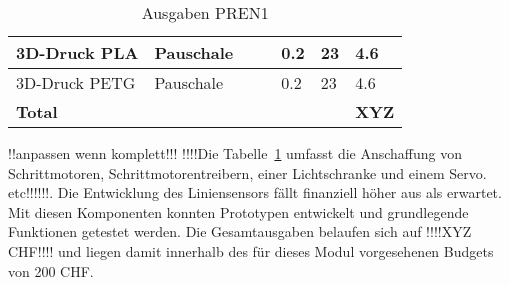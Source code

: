 \documentclass[main.tex]{subfiles} %
\begin{document}
\begin{table}[h]
{\begin{tabular}{|p{3cm}|p{2.5cm}|p{2.5cm}|p{3cm}|p{1cm}|p{1.5cm}|p{1cm}|}
        3D-Druck PLA                           & Pauschale              &                               &                                 & 0.2                 & 23                         & 4.6                              \\ \hline
        3D-Druck PETG                          & Pauschale              &                               &                                 & 0.2                 & 23                         & 4.6                              \\ \hline

        \textbf{Total}                         &                        &                               &                                 &                     &                            & \textbf{XYZ}                   \\ \hline
    \end{tabular}
    }
    \caption{Ausgaben PREN1}
    \label{tab:Ausgaben_PREN1}
\end{table}


!!anpassen wenn komplett!!!
!!!!Die Tabelle~\ref{tab:Ausgaben_PREN1} umfasst die Anschaffung von Schrittmotoren, Schrittmotorentreibern, einer 
Lichtschranke und einem Servo. etc!!!!!!. Die Entwicklung des Liniensensors fällt finanziell höher aus als erwartet.
Mit diesen Komponenten konnten Prototypen entwickelt und grundlegende 
Funktionen getestet werden. Die Gesamtausgaben belaufen sich auf !!!!XYZ CHF!!!! und liegen damit innerhalb des 
für dieses Modul vorgesehenen Budgets von 200 CHF.
\end{document}
